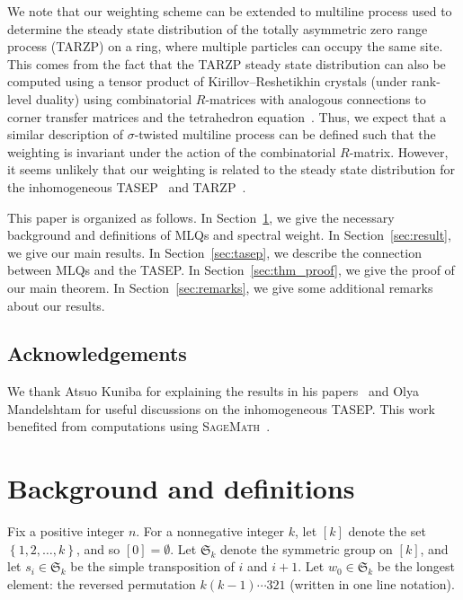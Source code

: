 \documentclass[reqno]{amsart}
\newcommand{\0}{\phantom{c}}
\newcommand{\SymGp}[1]{\mathfrak{S}_{#1}} %
\newcommand{\set}[1]{\left\{ #1 \right\}}
\newcommand{\ive}[1]{\left[ #1 \right]}
\theoremstyle{plain}
\theoremstyle{definition}
\numberwithin{equation}{section}
\begin{document}
We note that our weighting scheme can be extended to multiline process used to determine the steady state distribution of the totally asymmetric zero range process (TARZP) on a ring, where multiple particles can occupy the same site.
This comes from the fact that the TARZP steady state distribution can also be computed using a tensor product of Kirillov--Reshetikhin crystals (under rank-level duality) using combinatorial $R$-matrices with analogous connections to corner transfer matrices and the tetrahedron equation~\cite{KMO16TARZP,KMO16TARZPII}.
Thus, we expect that a similar description of $\sigma$-twisted multiline process can be defined such that the weighting is invariant under the action of the combinatorial $R$-matrix.
However, it seems unlikely that our weighting is related to the steady state distribution for the inhomogeneous TASEP~\cite{AM13,AL14} and TARZP~\cite{KMO16II}.

This paper is organized as follows.
In Section~\ref{sec:background}, we give the necessary background and definitions of MLQs and spectral weight.
In Section~\ref{sec:result}, we give our main results.
In Section~\ref{sec:tasep}, we describe the connection between MLQs and the TASEP.
In Section~\ref{sec:thm_proof}, we give the proof of our main theorem.
In Section~\ref{sec:remarks}, we give some additional remarks about our results.


\subsection{Acknowledgements}

We thank Atsuo Kuniba for explaining the results in his papers~\cite{KMO15,KMO16II,KMO16,KMO16TARZP,KMO16TARZPII} and Olya Mandelshtam for useful discussions on the inhomogeneous TASEP.
This work benefited from computations using \textsc{SageMath}~\cite{sage,combinat}.









\section{Background and definitions}
\label{sec:background}

Fix a positive integer $n$.
For a nonnegative integer $k$, let $\ive{k}$ denote the set $\set{1, 2, \ldots, k}$, and so $[0] = \emptyset$.
Let $\SymGp{k}$ denote the symmetric group on $\ive{k}$, and let $s_i \in \SymGp{k}$ be the simple transposition of $i$ and $i+1$.
Let $w_0 \in \SymGp{k}$ be the longest element: the reversed permutation $k (k-1) \dotsm 321$ (written in one line notation).
\end{document}
